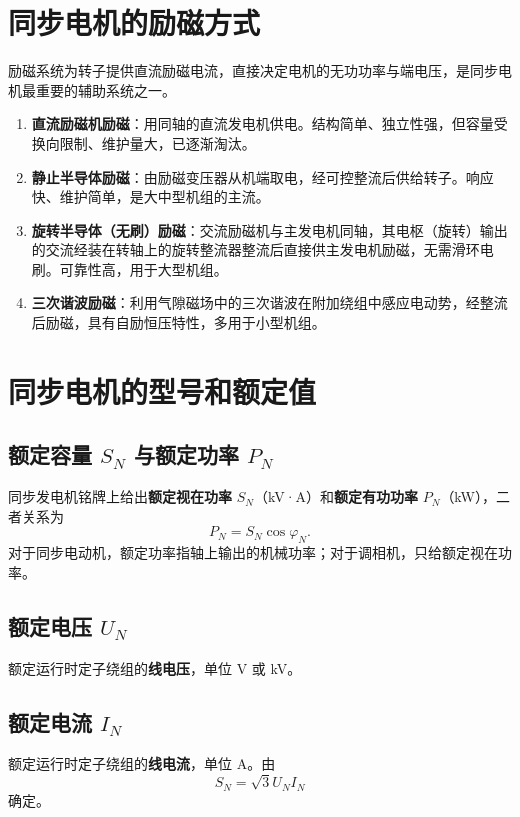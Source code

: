 \section{同步电机的励磁方式}

励磁系统为转子提供直流励磁电流，直接决定电机的无功功率与端电压，是同步电机最重要的辅助系统之一。

\begin{enumerate}
  \item \textbf{直流励磁机励磁}：用同轴的直流发电机供电。结构简单、独立性强，但容量受换向限制、维护量大，已逐渐淘汰。
  \item \textbf{静止半导体励磁}：由励磁变压器从机端取电，经可控整流后供给转子。响应快、维护简单，是大中型机组的主流。
  \item \textbf{旋转半导体（无刷）励磁}：交流励磁机与主发电机同轴，其电枢（旋转）输出的交流经装在转轴上的旋转整流器整流后直接供主发电机励磁，无需滑环电刷。可靠性高，用于大型机组。
  \item \textbf{三次谐波励磁}：利用气隙磁场中的三次谐波在附加绕组中感应电动势，经整流后励磁，具有自励恒压特性，多用于小型机组。
\end{enumerate}

\section{同步电机的型号和额定值}

\subsection{额定容量 $S_N$ 与额定功率 $P_N$}
同步发电机铭牌上给出\textbf{额定视在功率} $S_N$（kV·A）和\textbf{额定有功功率} $P_N$（kW），二者关系为
\begin{equation}
P_N=S_N\cos\varphi_N .
\end{equation}
对于同步电动机，额定功率指轴上输出的机械功率；对于调相机，只给额定视在功率。

\subsection{额定电压 $U_N$}
额定运行时定子绕组的\textbf{线电压}，单位 V 或 kV。

\subsection{额定电流 $I_N$}
额定运行时定子绕组的\textbf{线电流}，单位 A。由
\begin{equation}
S_N=\sqrt3U_NI_N
\end{equation}
确定。

